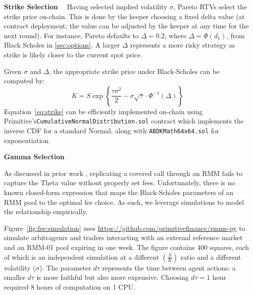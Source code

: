 \documentclass[hidelinks, 12pt]{article}
\begin{document}
\textbf{Strike Selection}$\quad$ Having selected implied volatility $\sigma$, Pareto RTVs select the strike price on-chain. 
This is done by the keeper choosing a fixed delta value (at contract deployment; the value can be adjusted by the keeper at any time for the next round). For instance, Pareto defaults to $\Delta = 0.2$, where $\Delta = \Phi(d_1)$, from Black Scholes in \ref{sec:options}.
A larger $\Delta$ represents a more risky strategy as strike is likely closer to the current spot price. 

Given $\sigma$ and $\Delta$, the appropriate strike price under Black-Scholes can be computed by: 
\begin{equation}
  K = S \exp \left\{ \frac{\tau \sigma^2}{2} - \sigma \sqrt{\tau} \cdot \Phi^{-1}(\Delta) \right\}
  \label{eq:strike}
\end{equation}
Equation~\ref{eq:strike} can be efficiently implemented on-chain using Primitive's\newline \texttt{CumulativeNormalDistribution.sol} contract which implements the inverse CDF for a standard Normal, along with \texttt{ABDKMath64x64.sol} for exponentiation.

\textbf{Gamma Selection}$\quad$

As discussed in prior work \cite{angeris2021replicating}, replicating a covered call through an RMM fails to capture the Theta value without properly set fees.
Unfortunately, there is no known closed-form expression that maps the Black-Scholes parameters of an RMM pool to the optimal fee choice.
As such, we leverage simulations to model the relationship empirically.

Figure~\ref{fig:fee:simulation} uses \url{https://github.com/primitivefinance/rmms-py} to simulate arbitrageurs and traders interacting with an external reference market and an RMM-01 pool expiring in one week. The figure contains 400 squares, each of which is an independent simulation at a different $\left(\frac{S}{K}\right)$ ratio and a different volatility ($\sigma$). The parameter $d\tau$ represents the time between agent actions: a smaller $d\tau$ is more faithful but also more expensive. Choosing $d\tau = 1$ hour required 8 hours of computation on 1 CPU.
\end{document}

